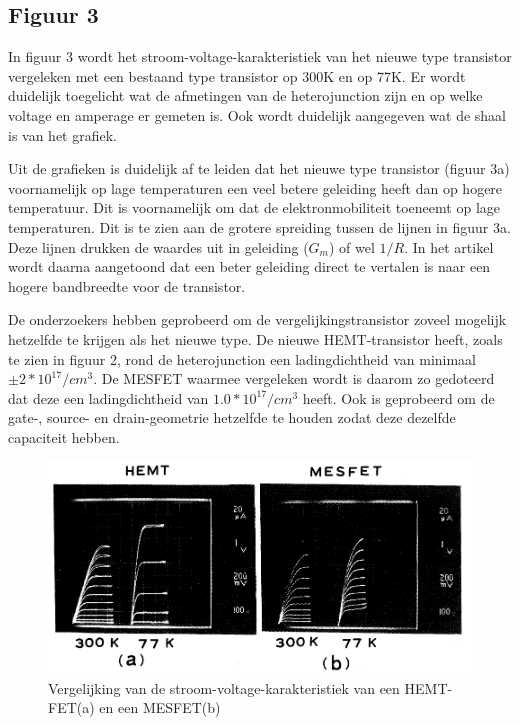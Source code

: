 \documentclass[11pt]{article}
\begin{document}
\subsection{Figuur 3}
In figuur 3 wordt het stroom-voltage-karakteristiek van het nieuwe type transistor vergeleken met een bestaand type transistor op 300K en op 77K. Er wordt duidelijk toegelicht wat de afmetingen van de heterojunction zijn en op welke voltage en amperage er gemeten is. Ook wordt duidelijk aangegeven wat de shaal is van het grafiek.

Uit de grafieken is duidelijk af te leiden dat het nieuwe type transistor (figuur 3a) voornamelijk op lage temperaturen een veel betere geleiding heeft dan op hogere temperatuur. Dit is voornamelijk om dat de elektronmobiliteit toeneemt op lage temperaturen. Dit is te zien aan de grotere spreiding tussen de lijnen in figuur 3a. Deze lijnen drukken de waardes uit in geleiding ($G_m$) of wel  $1/R$. In het artikel wordt daarna aangetoond dat een beter geleiding direct te vertalen is naar een hogere bandbreedte voor de transistor.

De onderzoekers hebben geprobeerd om de vergelijkingstransistor zoveel mogelijk hetzelfde te krijgen als het nieuwe type. De nieuwe HEMT-transistor heeft, zoals te zien in figuur 2, rond de heterojunction een ladingdichtheid van minimaal $\pm2*10^{17}/cm^3$. De MESFET waarmee vergeleken wordt is daarom zo gedoteerd dat deze een ladingdichtheid van $1.0 * 10^{17}/cm^3$ heeft. Ook is geprobeerd om de gate-, source- en drain-geometrie hetzelfde te houden zodat deze dezelfde capaciteit hebben.

\begin{figure}[h]
  \begin{center}
\includegraphics[width=\textwidth]{CV-characteristics.png}
\caption{Vergelijking van de stroom-voltage-karakteristiek van een HEMT-FET(a) en een MESFET(b)}
\label{fig:cv_karakteristieken}
  \end{center}
\end{figure}
\end{document}
